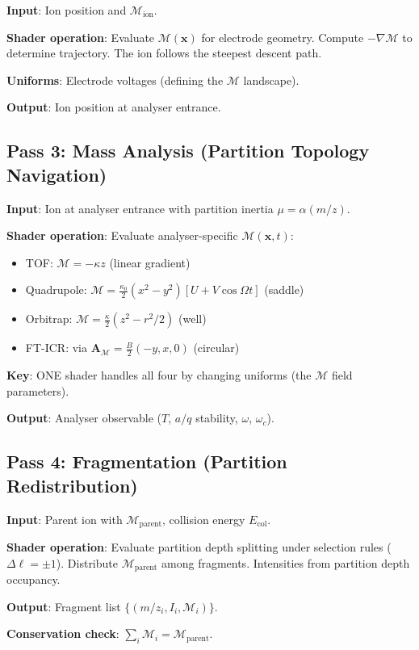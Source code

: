 \documentclass[11pt,twocolumn,a4paper]{article}
\theoremstyle{definition}
\theoremstyle{remark}
\newcommand{\Depth}{\mathcal{M}}
\newcommand{\partinert}{\mu}
\newcommand{\Apartition}{\mathbf{A}_{\mathcal{M}}}
\begin{document}
\textbf{Input}: Ion position and $\Depth_{\mathrm{ion}}$.

\textbf{Shader operation}: Evaluate $\Depth(\mathbf{x})$ for electrode geometry. Compute $-\nabla\Depth$ to determine trajectory. The ion follows the steepest descent path.

\textbf{Uniforms}: Electrode voltages (defining the $\Depth$ landscape).

\textbf{Output}: Ion position at analyser entrance.

\subsection{Pass 3: Mass Analysis (Partition Topology Navigation)}

\textbf{Input}: Ion at analyser entrance with partition inertia $\partinert = \alpha(m/z)$.

\textbf{Shader operation}: Evaluate analyser-specific $\Depth(\mathbf{x},t)$:
\begin{itemize}[nosep]
\item TOF: $\Depth = -\kappa z$ (linear gradient)
\item Quadrupole: $\Depth = \frac{\kappa_0}{2}(x^2-y^2)[U + V\cos\Omega t]$ (saddle)
\item Orbitrap: $\Depth = \frac{\kappa}{2}(z^2 - r^2/2)$ (well)
\item FT-ICR: via $\Apartition = \frac{B}{2}(-y,x,0)$ (circular)
\end{itemize}

\textbf{Key}: ONE shader handles all four by changing uniforms (the $\Depth$ field parameters).

\textbf{Output}: Analyser observable ($T$, $a/q$ stability, $\omega$, $\omega_c$).

\subsection{Pass 4: Fragmentation (Partition Redistribution)}

\textbf{Input}: Parent ion with $\Depth_{\mathrm{parent}}$, collision energy $E_{\mathrm{col}}$.

\textbf{Shader operation}: Evaluate partition depth splitting under selection rules ($\Delta\ell = \pm 1$). Distribute $\Depth_{\mathrm{parent}}$ among fragments. Intensities from partition depth occupancy.

\textbf{Output}: Fragment list $\{(m/z_i, I_i, \Depth_i)\}$.

\textbf{Conservation check}: $\sum_i \Depth_i = \Depth_{\mathrm{parent}}$.
\end{document}
